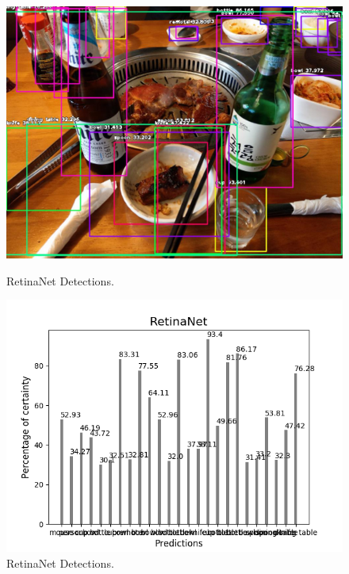     \begin{figure}[htb]
        \centering
        \begin{minipage}[b]{0.44\textwidth}
          \includegraphics[width=\textwidth]{Sections/4InitialWork/4_images_obj_run2/retinaNet.jpg}
          \caption{RetinaNet Detections.}
        \end{minipage}
        \hfill
        \begin{minipage}[b]{0.50\textwidth}
          \includegraphics[width=\textwidth]{Sections/4InitialWork/4_images_obj_run2/retinaNet_graph.png}
          \caption{RetinaNet Detections.}
        \end{minipage}
      \end{figure}
    

